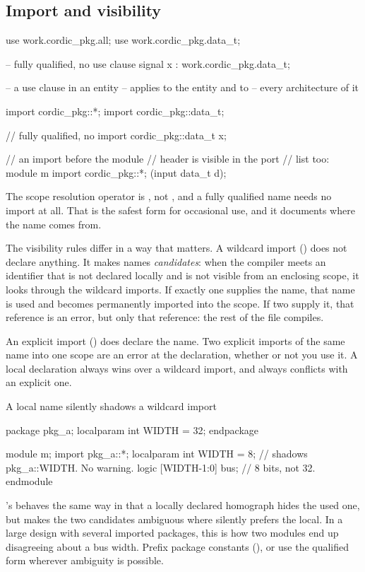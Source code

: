 \subsection{Import and visibility}

\begin{rosetta}
\begin{rleft}
use work.cordic_pkg.all;
use work.cordic_pkg.data_t;

-- fully qualified, no use clause
signal x : work.cordic_pkg.data_t;

-- a use clause in an entity
-- applies to the entity and to
-- every architecture of it
\end{rleft}
\begin{rright}
import cordic_pkg::*;
import cordic_pkg::data_t;

// fully qualified, no import
cordic_pkg::data_t x;

// an import before the module
// header is visible in the port
// list too:
module m
  import cordic_pkg::*;
  (input data_t d);
\end{rright}
\end{rosetta}

The scope resolution operator is \code{::}, not , and a fully qualified
name needs no import at all. That is the safest form for occasional use, and it
documents where the name comes from.

The visibility rules differ in a way that matters. A wildcard import
() does not declare anything. It makes names
\emph{candidates}: when the compiler meets an identifier that is not declared
locally and is not visible from an enclosing scope, it looks through the
wildcard imports. If exactly one supplies the name, that name is used and
becomes permanently imported into the scope. If two supply it, that reference
is an error, but only that reference: the rest of the file compiles.

An explicit import () does declare the name. Two
explicit imports of the same name into one scope are an error at the
declaration, whether or not you use it. A local declaration always wins over a
wildcard import, and always conflicts with an explicit one.

\begin{gotcha}{A local name silently shadows a wildcard import}
\begin{svcode}
package pkg_a;  localparam int WIDTH = 32;  endpackage

module m;
  import pkg_a::*;
  localparam int WIDTH = 8;    // shadows pkg_a::WIDTH. No warning.
  logic [WIDTH-1:0] bus;       // 8 bits, not 32.
endmodule
\end{svcode}
\VHDL{}'s  behaves the same way in that a locally declared
homograph hides the used one, but \VHDL{} makes the two candidates ambiguous
where \SV{} silently prefers the local. In a large design with several
imported packages, this is how two modules end up disagreeing about a bus
width. Prefix package constants (), or use the qualified form
 wherever ambiguity is possible.
\end{gotcha}

